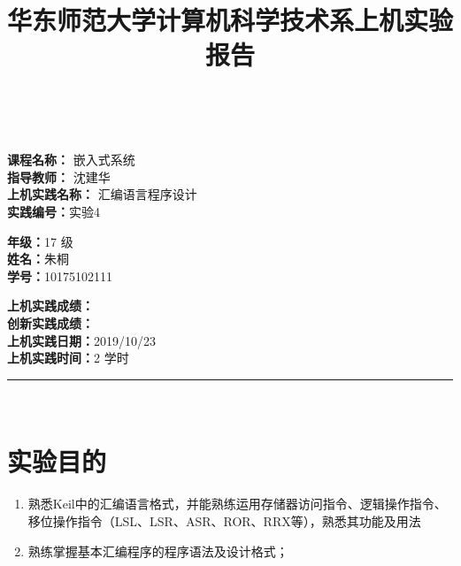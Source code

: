 \documentclass[a4paper,10pt,UTF8]{paper}
\title{华东师范大学计算机科学技术系上机实验报告}
\numberwithin{equation}{section}
\numberwithin{figure}{section}
\begin{document}
\pagestyle{fancy}
\lhead{}
\rhead{}
\makeatletter
\def\headrule{{\if@fancyplain\let\headrulewidth\plainheadrulewidth\fi%
\color{gray}\hrule\@height 0.2pt\@width\headwidth}
  \vspace{6mm}}
\makeatother

\newcommand{\HRule}{\rule{\linewidth}{1mm}}
\newcommand{\dai}{\textbf{Dais-CMX16$^+$}}

{ \\ [0.8cm]
		
	\small{
		\begin{minipage}[t]{.32\linewidth}
			\textbf{课程名称：} 嵌入式系统\\
			\textbf{指导教师：} 沈建华\\
			\textbf{上机实践名称：} 汇编语言程序设计\\
			\textbf{实践编号：}实验4
		\end{minipage}
		\begin{minipage}[t]{.32\linewidth}
			\textbf{年级：}17 级\\
			\textbf{姓名：}朱桐\\
			\textbf{学号：}10175102111\\
		\end{minipage} 
		\begin{minipage}[t]{.32\linewidth}
			\textbf{上机实践成绩：} \\
			\textbf{创新实践成绩：} \\
			\textbf{上机实践日期：}2019/10/23\\
			\textbf{上机实践时间：}2 学时\\
		\end{minipage}
	}
	\HRule \\[0.5cm]
}


\section{实验目的}

\begin{enumerate}
    \item 熟悉Keil中的汇编语言格式，并能熟练运用存储器访问指令、逻辑操作指令、移位操作指令（LSL、LSR、ASR、ROR、RRX等），熟悉其功能及用法
    \item 熟练掌握基本汇编程序的程序语法及设计格式；
\end{enumerate}
\end{document}
